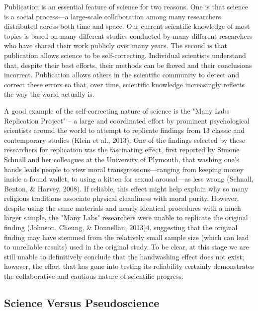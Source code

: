 Publication is an essential feature of science for two reasons. One is that science is a social process---a large-scale collaboration among many researchers distributed across both time and space. Our current scientific knowledge of most topics is based on many different studies conducted by many different researchers who have shared their work publicly over many years. The second is that publication allows science to be self-correcting. Individual scientists understand that, despite their best efforts, their methods can be flawed and their conclusions incorrect. Publication allows others in the scientific community to detect and correct these errors so that, over time, scientific knowledge increasingly reflects the way the world actually is.

A good example of the self-correcting nature of science is the "Many Labs Replication Project" -- a large and coordinated effort by prominent psychological scientists around the world to attempt to replicate findings from 13 classic and contemporary studies (Klein et al., 2013). One of the findings selected by these researchers for replication was the fascinating effect, first reported by Simone Schnall and her colleagues at the University of Plymouth, that washing one's hands leads people to view moral transgressions---ranging from keeping money inside a found wallet, to using a kitten for sexual arousal---as less wrong (Schnall, Benton, \& Harvey, 2008). If reliable, this effect might help explain why so many religious traditions associate physical cleanliness with moral purity. However, despite using the same materials and nearly identical procedures with a much larger sample, the "Many Labs" researchers were unable to replicate the original finding (Johnson, Cheung, \& Donnellan, 2013)4, suggesting that the original finding may have stemmed from the relatively small sample size (which can lead to unreliable results) used in the original study. To be clear, at this stage we are still unable to definitively conclude that the handwashing effect does not exist; however, the effort that has gone into testing its reliability certainly demonstrates the collaborative and cautious nature of scientific progress.


\subsection{Science Versus Pseudoscience}

